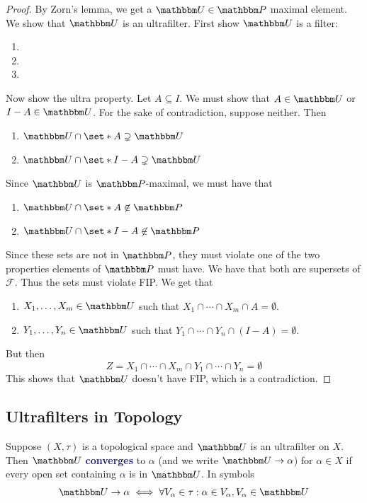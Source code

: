\documentclass[11pt]{article}
\numberwithin{equation}{section}
\newcommand{\navy}[1]{\textcolor{MidnightBlue}{\bf #1}}
\theoremstyle{definition}
\theoremstyle{definition}
\def\Set{\set*}%
\def\sse{\subseteq}
\newcommand{\1}{\mathbbm 1}
\def\t{\tau}
\newcommand{\PP}{\mathbbm P}
\newcommand{\UU}{\mathbbm U}
\newcommand{\fF}{\mathcal F}
\begin{document}
\begin{proof}
	By Zorn's lemma, we get a $\UU \in \PP$ maximal element. We show that $\UU$ is an ultrafilter. First show $\UU$ is a filter:
	\begin{enumerate}
		\item 
		\item
		\item
	\end{enumerate}

	Now show the ultra property. Let $A \sse I$. We must show that $A \in \UU$ or $I - A \in \UU$. For the sake of contradiction, suppose neither. Then 
	\begin{enumerate}
		\item $\UU \cap \Set{A} \supsetneq \UU$
		\item $\UU \cap \Set{I-A} \supsetneq \UU$
	\end{enumerate}
	Since $\UU$ is $\PP$-maximal, we must have that
	\begin{enumerate}
		\item $\UU \cap \Set{A} \not\in \PP$
		\item $\UU \cap \Set{I-A} \not\in \PP$
	\end{enumerate}
	Since these sets are not in $\PP$, they must violate one of the two properties elements of $\PP$ must have. We have that both are supersets of $\fF$. Thus the sets must violate FIP. We get that
	\begin{enumerate}
		\item $X_1,\ldots,X_m \in \UU$ such that $X_1\cap\cdots\cap X_m \cap A = \emptyset$.
		\item $Y_1,\ldots,Y_n \in \UU$ such that $Y_1\cap\cdots\cap Y_n \cap (I-A) = \emptyset$.
	\end{enumerate}
	But then
	\begin{equation}
		Z = X_1\cap\cdots\cap X_m \cap Y_1\cap\cdots\cap Y_n = \emptyset
	\end{equation}
	This shows that $\UU$ doesn't have FIP, which is a contradiction. 
\end{proof}

\subsection{Ultrafilters in Topology}

\begin{definition}
	Suppose $(X,\t)$ is a topological space and $\UU$ is an ultrafilter on $X$. Then $\UU$ \navy{converges} to $\alpha$ (and we write $\UU \to \alpha$) for $\alpha \in X$ if every open set containing $\alpha$ is in $\UU$. In symbols
	\begin{equation}
		\UU \to \alpha \iff \forall V_\alpha \in \t : \alpha \in V_\alpha, V_\alpha \in \UU
	\end{equation}
\end{definition}
\end{document}
